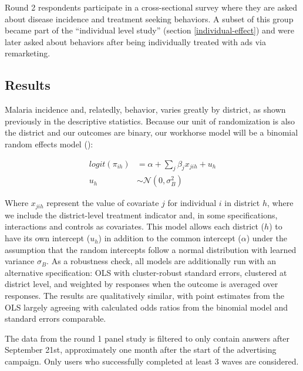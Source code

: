 \documentclass[a4paper,12pt]{article}
\begin{document}
Round 2 respondents participate in a cross-sectional survey where they are asked about disease incidence and treatment seeking behaviors. A subset of this group became part of the ``individual level study'' (section \ref{individual-effect}) and were later asked about behaviors after being individually treated with ads via remarketing.






\subsection{Results}

Malaria incidence and, relatedly, behavior, varies greatly by district, as shown previously in the descriptive statistics. Because our unit of randomization is also the district and our outcomes are binary, our workhorse model will be a binomial random effects model (\cite{Hayes2017}):

\begin{align*}
logit(\pi_{ih}) &= \alpha + \sum_j \beta_j x_{jih} + u_h \\
u_h &\sim \mathcal{N}(0, \sigma_B^2)
\end{align*}

Where $x_{jih}$ represent the value of covariate $j$ for individual $i$ in district $h$, where we include the district-level treatment indicator and, in some specifications, interactions and controls as covariates. This model allows each district ($h$) to have its own intercept ($u_h$) in addition to the common intercept ($\alpha$) under the assumption that the random intercepts follow a normal distribution with learned variance $\sigma_B$. As a robustness check, all models are additionally run with an alternative specification: OLS with cluster-robust standard errors, clustered at district level, and weighted by responses when the outcome is averaged over responses. The results are qualitatively similar, with point estimates from the OLS largely agreeing with calculated odds ratios from the binomial model and standard errors comparable.


The data from the round 1 panel study is filtered to only contain answers after September 21st, approximately one month after the start of the advertising campaign. Only users who successfully completed at least 3 waves are considered.
\end{document}
